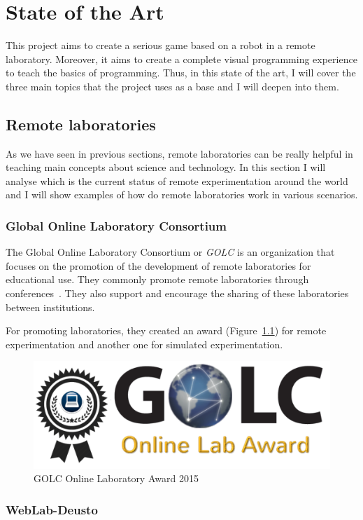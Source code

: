\chapter{State of the Art}

This project aims to create a serious game based on a robot in a remote laboratory. Moreover, it
aims to create a complete visual programming experience to teach the basics of programming. Thus,
in this state of the art, I will cover the three main topics that the project uses as a base and I
will deepen into them.

\section{Remote laboratories}

As we have seen in previous sections, remote laboratories can be really helpful in teaching main
concepts about science and technology. In this section I will analyse which is the current status of
remote experimentation around the world and I will show examples of how do remote laboratories work
in various scenarios.

\subsection{Global Online Laboratory Consortium}

The Global Online Laboratory Consortium or \textit{GOLC} is an organization that focuses on
the promotion of the development of remote laboratories for educational use. They commonly promote
remote laboratories through conferences~\cite{golc1st}. They also support and encourage the sharing
of these laboratories between institutions.

For promoting laboratories, they created an award (Figure~\ref{fig:golc_award}) for remote
experimentation and another one for simulated experimentation.

\begin{figure}[h]
	\centering
	\includegraphics[width=.4\textwidth]{fig/golc_award}
	\caption{GOLC Online Laboratory Award 2015}\label{fig:golc_award}
\end{figure}

\subsection{WebLab-Deusto}

